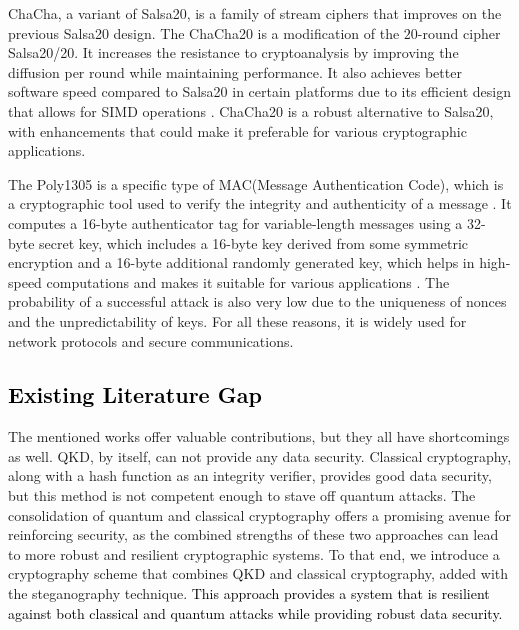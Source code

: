 \documentclass[a4paper]{cas-sc}
\begin{document}
ChaCha, a variant of Salsa20, is a family of stream ciphers that improves on the previous Salsa20 design. The ChaCha20 is a modification of the $20$-round cipher Salsa20/20. It increases the resistance to cryptoanalysis by improving the diffusion per round while maintaining performance. It also achieves better software speed compared to Salsa20 in certain platforms due to its efficient design that allows for SIMD operations \cite{bernstein2008chacha}. ChaCha20 is a robust alternative to Salsa20, with enhancements that could make it preferable for various cryptographic applications.

The Poly1305 is a specific type of MAC(Message Authentication Code), which is a cryptographic tool used to verify the integrity and authenticity of a message \cite{bernstein2005poly1305}. It computes a 16-byte authenticator tag for variable-length messages using a 32-byte secret key, which includes a 16-byte key derived from some symmetric encryption and a 16-byte additional randomly generated key, which helps in high-speed computations and makes it suitable for various applications \cite{bernstein2005poly1305}. The probability of a successful attack is also very low due to the uniqueness of nonces and the unpredictability of keys. For all these reasons, it is widely used for network protocols and secure communications.
\subsection{\textcolor{black}{Existing Literature Gap}}
The mentioned works offer valuable contributions, but they all have shortcomings as well. QKD, by itself, can not
provide any data security. Classical cryptography, along with a hash function as an integrity verifier, provides good data security, but this method is not competent enough to stave off quantum attacks. The consolidation of quantum and classical cryptography offers a promising avenue for reinforcing security, as the combined strengths of these two approaches can lead to more robust and resilient cryptographic systems. To that end, we introduce a cryptography scheme that combines QKD and classical cryptography, added with the steganography technique. \textcolor{black}{This approach provides a system that is resilient against both classical and quantum attacks while providing robust data security.}
\end{document}
